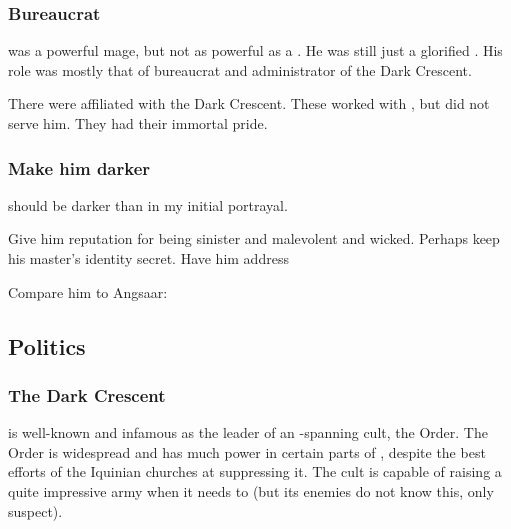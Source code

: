 \subsubsection{Bureaucrat}
\Psyrex was a powerful mage, but not as powerful as a \quiljaaran.
He was still just a glorified \scatha. 
His role was mostly that of bureaucrat and administrator of the Dark Crescent. 

There were \quiljaaran affiliated with the Dark Crescent. 
These worked with \Psyrex, but did not serve him.
They had their immortal pride. 





\subsubsection{Make him darker}
\Psyrex should be darker than in my initial portrayal.

Give him reputation for being sinister and malevolent and wicked.
Perhaps keep his master's identity secret. 
Have him address 

Compare him to Angsaar:










\subsection{Politics}
\subsubsection{The Dark Crescent}
\Psyrex{} is well-known and infamous as the leader of an \Azmith-spanning cult, the  Order. The Order is widespread and has much power in certain parts of \Velcad{}, despite the best efforts of the Iquinian churches at suppressing it. The cult is capable of raising a quite impressive army when it needs to (but its enemies do not know this, only suspect). 
















